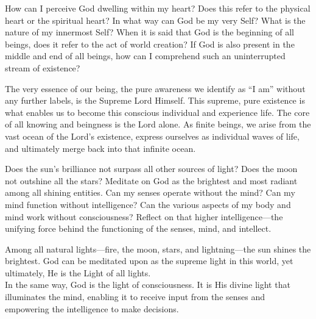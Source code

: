 \begin{mananam}{}
\normalfont\mananamtext How can I perceive God dwelling within my heart? Does this refer to the physical heart or the spiritual heart? In what way can God be my very Self? What is the nature of my innermost Self?
When it is said that God is the beginning of all beings, does it refer to the act of world creation? If God is also present in the middle and end of all beings, how can I comprehend such an uninterrupted stream of existence?
\end{mananam}
\sreflect
\begin{inspiration}{}
\normalfont\mananamtext The very essence of our being, the pure awareness we identify as \enquote{I am} without any further labels, is the Supreme Lord Himself. This supreme, pure existence is what enables us to become this conscious individual and experience life. The core of all knowing and beingness is the Lord alone. As finite beings, we arise from the vast ocean of the Lord’s existence, express ourselves as individual waves of life, and ultimately merge back into that infinite ocean.
\end{inspiration}

\newpage
\begin{mananam}{}
\normalfont\mananamtext Does the sun’s brilliance not surpass all other sources of light? Does the moon not outshine all the stars? Meditate on God as the brightest and most radiant among all shining entities.
Can my senses operate without the mind? Can my mind function without intelligence? Can the various aspects of my body and mind work without consciousness? Reflect on that higher intelligence—the unifying force behind the functioning of the senses, mind, and intellect.
\end{mananam}
\sreflect
\begin{inspiration}{}
\normalfont\mananamtext Among all natural lights—fire, the moon, stars, and lightning—the sun shines the brightest. God can be meditated upon as the supreme light in this world, yet ultimately, He is the Light of all lights.\\
In the same way, God is the light of consciousness. It is His divine light that illuminates the mind, enabling it to receive input from the senses and empowering the intelligence to make decisions.
\end{inspiration}
\newpage

